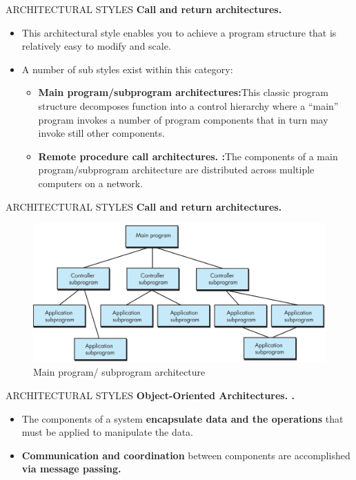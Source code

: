 \documentclass{beamer}
\begin{document}
\begin{frame}{ARCHITECTURAL STYLES}
	\textbf{Call and return architectures.}
	\begin{itemize}
		\item This architectural style enables you 
		to achieve a program structure that is relatively easy to modify and 
		scale. 
		\item A number of sub styles exist within this category:
		\begin{itemize}
			\item \textbf{Main program/subprogram architectures:}This classic 
			program structure decomposes function into a control 
			hierarchy where a “main” program invokes a number of 
			program components that in turn may invoke still other 
			components. 
			\item \textbf{Remote procedure call architectures. :}The components of a main program/subprogram architecture are distributed across 
			multiple computers on a network.

			
		\end{itemize}
	\end{itemize}
\end{frame}
\begin{frame}{ARCHITECTURAL STYLES}
	\textbf{Call and return architectures.}
	\begin{figure}
		\includegraphics[scale=.45]{img/m2_38.jpg}
		\caption{Main program/
			subprogram 
			architecture }
	\end{figure}
	
\end{frame}
\begin{frame}{ARCHITECTURAL STYLES}
	\textbf{Object-Oriented Architectures. .}
\begin{itemize}
	\item The components of a system \textbf{encapsulate data and the 
		operations} that must be applied to manipulate the data.
	\item \textbf{Communication and coordination }
	between components are accomplished \textbf{via message passing.}
\end{itemize}
\end{frame}
\end{document}
